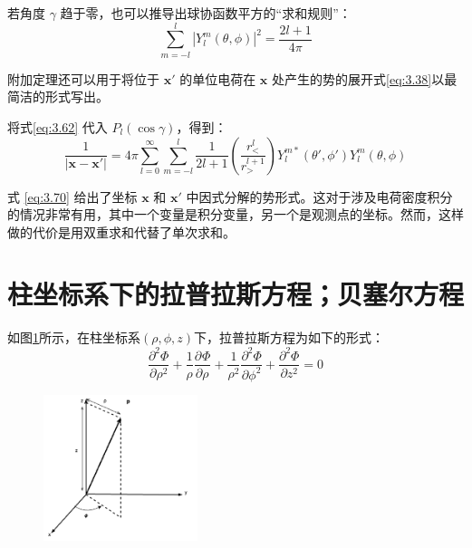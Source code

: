 \documentclass[lang=cn,10pt,newtx,bibend=biber,device=pad]{elegantbook}
\newcommand{\pderi}[3]{\dfrac{\partial^{#1}#2}{\partial {#3}^{#1}}}%
\begin{document}
若角度 $\gamma$ 趋于零，也可以推导出球协函数平方的“求和规则”：
\begin{equation}\label{eq:3.69}
    \sum_{m=-l}^l |Y_l^m(\theta, \phi)|^2 = \frac{2l + 1}{4\pi} \tag{3.69}    
\end{equation}

附加定理还可以用于将位于 $\mathbf{x}{\prime}$ 的单位电荷在 $\mathbf{x}$ 处产生的势的展开式\ref{eq:3.38}以最简洁的形式写出。

将式\ref{eq:3.62} 代入 $P_l(\cos \gamma)$，得到：
\begin{equation}\label{eq:3.70}
\frac{1}{|\mathbf{x} - \mathbf{x}{\prime}|} = 4\pi \sum_{l=0}^\infty \sum_{m=-l}^l \frac{1}{2l + 1} \left(\frac{r_<^l}{r_>^{l+1}}\right) Y_l^{m*}(\theta{\prime}, \phi{\prime}) Y_l^m(\theta, \phi) \tag{3.70}
\end{equation}

式 \ref{eq:3.70} 给出了坐标 $\mathbf{x}$ 和 $\mathbf{x}{\prime}$ 中因式分解的势形式。这对于涉及电荷密度积分的情况非常有用，其中一个变量是积分变量，另一个是观测点的坐标。然而，这样做的代价是用双重求和代替了单次求和。
\section{柱坐标系下的拉普拉斯方程；贝塞尔方程}
如图\ref{fig:cylin_coor}所示，在柱坐标系$(\rho,\phi,z)$下，拉普拉斯方程为如下的形式：
\begin{equation}\label{eq:3.71}
    \pderi{2}{\Phi}{\rho} + \frac{1}{\rho} \pderi{}{\Phi}{\rho} + \frac{1}{\rho^2} \pderi{2}{\Phi}{\phi} + \pderi{2}{\Phi}{z} = 0 
\end{equation}
\begin{figure}[h]
    \centering
    \includegraphics[width=0.4\textwidth]{figure/clyin_coor.png}
    \caption{}
    \label{fig:cylin_coor}
\end{figure}
\end{document}
